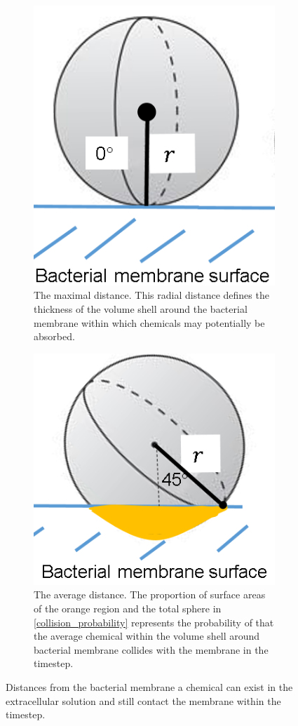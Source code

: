 \begin{supplementary}
\begin{figure}
    \centering
    \begin{subfigure}[b]{0.45\textwidth}
        \centering
        \includegraphics{images/WCMpy/maximal_far.png}
        \caption{
            The maximal distance. This radial distance defines the thickness of the volume shell around the bacterial membrane within which chemicals may potentially be absorbed.  
        }
    \end{subfigure}
    \hfill
    \begin{subfigure}[b]{0.45\textwidth}
        \centering
        \includegraphics{images/WCMpy/average_far.png}
        \caption{
            The average distance. The proportion of surface areas of the orange region and the total sphere in \cref{collision_probability} represents the probability of that the average chemical within the volume shell around bacterial membrane collides with the membrane in the timestep.
        }
    \end{subfigure}
    \caption{
          Distances from the bacterial membrane a chemical can exist in the extracellular solution and still contact the membrane within the timestep.
    }
    \label{diffusion_distances}
\end{figure}


\end{supplementary}
